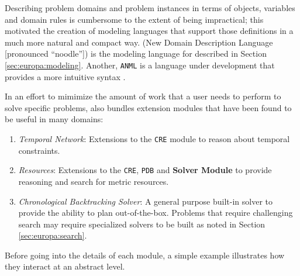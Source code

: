 Describing problem domains and problem instances in terms of objects,
variables and domain rules is cumbersome to the extent of being
impractical; this motivated the creation of modeling languages that
support those definitions in a much more natural and compact way. \nd
(New Domain Description Language [pronounced ``noodle'']) \cite{NDDL}
is the  modeling language for \eu described in
Section \ref{sec:europa:modeling}. Another, \texttt{ANML}
\cite{smith08} is a language under development that provides a more
intuitive syntax .
  
In an effort to mimimize the amount of work that a user needs to
perform to solve specific problems, \eu also bundles extension
modules that have been found to be useful in many domains:

\begin{enumerate}

\item \textit{Temporal Network}: Extensions to the \texttt{CRE} module to
  reason about temporal constraints.

\item \textit{Resources}: Extensions to the \texttt{CRE}, \texttt{PDB}
  and \textbf{Solver Module} to provide reasoning and search for
  metric resources.

\item \textit{Chronological Backtracking Solver}: A general purpose
  built-in solver to provide the ability to plan out-of-the-box.
  Problems that require challenging search may require specialized
  solvers to be built as noted in Section \ref{sec:europa:search}.

\end{enumerate}

Before going into the details of each module, a simple example
illustrates how they interact at an abstract level.

